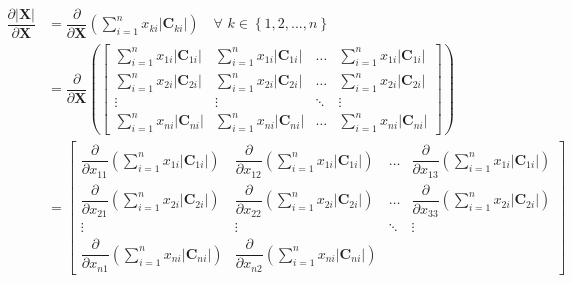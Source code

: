 \documentclass{article}
\newcommand\abs[1]{\left\lvert#1\right\rvert}
\begin{document}
\begin{align}
    \dfrac{\partial \abs{\mathbf{X}}}{\partial \mathbf{X}} &= \dfrac{\partial}{\partial \mathbf{X}} \left( \sum_{i = 1}^{n} x_{ki} \abs{\mathbf{C}_{ki}} \right) \,\,\,\,\,\, \forall \,\, k \in \left\{ 1, 2, ..., n \right\} \\
    & = \dfrac{\partial}{\partial \mathbf{X}} \left( \begin{bmatrix}
        \displaystyle \sum_{i = 1}^{n} x_{1i} \abs{\mathbf{C}_{1i}} & 
        \displaystyle \sum_{i = 1}^{n} x_{1i} \abs{\mathbf{C}_{1i}} & 
        \dots & 
        \displaystyle \sum_{i = 1}^{n} x_{1i} \abs{\mathbf{C}_{1i}} \\
        \displaystyle \sum_{i = 1}^{n} x_{2i} \abs{\mathbf{C}_{2i}} & 
        \displaystyle \sum_{i = 1}^{n} x_{2i} \abs{\mathbf{C}_{2i}} & 
        \dots & 
        \displaystyle \sum_{i = 1}^{n} x_{2i} \abs{\mathbf{C}_{2i}} \\
        \vdots & \vdots & \ddots & \vdots \\
        \displaystyle \sum_{i = 1}^{n} x_{ni} \abs{\mathbf{C}_{ni}} & 
        \displaystyle \sum_{i = 1}^{n} x_{ni} \abs{\mathbf{C}_{ni}} & 
        \dots & 
        \displaystyle \sum_{i = 1}^{n} x_{ni} \abs{\mathbf{C}_{ni}}
    \end{bmatrix} \right) \\
    & = \begin{bmatrix}
        \displaystyle \dfrac{\partial}{\partial x_{11}} \left( \sum_{i = 1}^{n} x_{1i} \abs{\mathbf{C}_{1i}} \right) & 
        \displaystyle \dfrac{\partial}{\partial x_{12}} \left( \sum_{i = 1}^{n} x_{1i} \abs{\mathbf{C}_{1i}} \right) & 
        \dots & 
        \displaystyle \dfrac{\partial}{\partial x_{13}} \left( \sum_{i = 1}^{n} x_{1i} \abs{\mathbf{C}_{1i}} \right) \\
        \displaystyle \dfrac{\partial}{\partial x_{21}} \left( \sum_{i = 1}^{n} x_{2i} \abs{\mathbf{C}_{2i}} \right) & 
        \displaystyle \dfrac{\partial}{\partial x_{22}} \left( \sum_{i = 1}^{n} x_{2i} \abs{\mathbf{C}_{2i}} \right) & 
        \dots & 
        \displaystyle \dfrac{\partial}{\partial x_{33}} \left( \sum_{i = 1}^{n} x_{2i} \abs{\mathbf{C}_{2i}} \right) \\
        \vdots & \vdots & \ddots & \vdots \\
        \displaystyle \dfrac{\partial}{\partial x_{n1}} \left( \sum_{i = 1}^{n} x_{ni} \abs{\mathbf{C}_{ni}} \right) & 
        \displaystyle \dfrac{\partial}{\partial x_{n2}} \left( \sum_{i = 1}^{n} x_{ni} \abs{\mathbf{C}_{ni}} \right) & 

\end{bmatrix}
\end{align}
\end{document}
